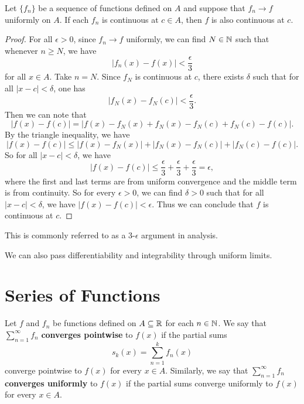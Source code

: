 \begin{theorem}
  Let $\{f_n\}$ be a sequence of functions defined
  on $A$ and suppose that $f_n \to f$ uniformly on $A$.
  If each $f_n$ is continuous at $c \in A$, then
  $f$ is also continuous at $c$.
\end{theorem}

\begin{proof}
  For all $\epsilon > 0$, since $f_n \to f$ uniformly,
  we can find $N \in \mathbb{N}$ such that whenever $n \ge N$,
  we have
  \[|f_n(x) - f(x)| < \frac{\epsilon}{3}\]
  for all $x \in A$. Take $n = N$. Since $f_N$ is continuous
  at $c$, there exists $\delta$ such that for all
  $|x - c| < \delta$, one has
  \[|f_N(x) - f_N(c)| < \frac{\epsilon}{3}.\]
  Then we can note that
  \[|f(x) - f(c)| = |f(x) - f_N(x) + f_N(x) - f_N(c) + f_N(c) - f(c)|.\]
  By the triangle inequality, we have
  \[|f(x) - f(c)| \le |f(x) - f_N(x)| + |f_N(x) - f_N(c)| + |f_N(c) - f(c)|.\]
  So for all $|x - c| < \delta$, we have
  \[|f(x) - f(c)| \le \frac{\epsilon}{3} + \frac{\epsilon}{3} + \frac{\epsilon}{3} = \epsilon,\]
  where the first and last terms are from uniform
  convergence and the middle term is from continuity.
  So for every $\epsilon > 0$, we can find $\delta > 0$
  such that for all $|x - c| < \delta$, we have
  $|f(x) - f(c)| < \epsilon$. Thus we can conclude that
  $f$ is continuous at $c$.
\end{proof}

\begin{remark}
  This is commonly referred to as a $3$-$\epsilon$
  argument in analysis.
\end{remark}

\begin{remark}
  We can also pass differentiability and integrability
  through uniform limits.
\end{remark}

\section{Series of Functions}

\begin{definition}
  Let $f$ and $f_n$ be functions defined on $A \subseteq \mathbb{R}$
  for each $n \in \mathbb{N}$. We say that
  $\sum_{n = 1}^\infty f_n$ \textbf{converges pointwise}
  to $f(x)$ if the partial sums
  \[s_k(x) = \sum_{n = 1}^k f_n(x)\]
  converge pointwise to $f(x)$ for every $x \in A$.
  Similarly, we say that $\sum_{n = 1}^\infty f_n$
  \textbf{converges uniformly} to $f(x)$ if the partial sums
  converge uniformly to $f(x)$ for every $x \in A$.
\end{definition}

